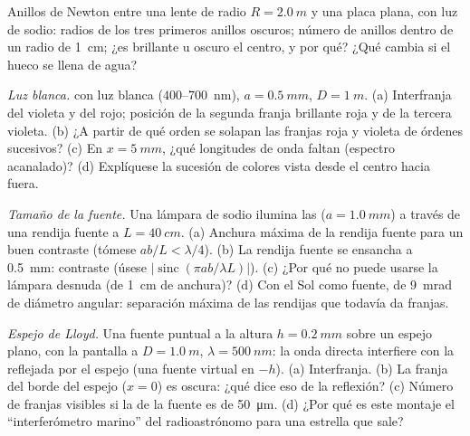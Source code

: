 \begin{exercise}[$\star$]\label{exo:b2:two-wave-interference:4}
Anillos de Newton entre una lente de radio $R = \qty{2.0}{m}$ y una placa plana, con
luz de sodio: radios de los tres primeros anillos oscuros; número de anillos
dentro de un radio de \qty{1}{cm}; ¿es brillante u oscuro el centro, y por qué?
¿Qué cambia si el hueco se llena de agua?
\end{exercise}

\begin{exercise}[$\star\star$]\label{exo:b2:two-wave-interference:5}
\emph{Luz blanca.}  con luz blanca ($400$--\qty{700}{nm}),
$a = \qty{0.5}{mm}$, $D = \qty{1}{m}$. (a) Interfranja del violeta y del rojo;
posición de la segunda franja brillante roja y de la tercera violeta. (b)
¿A partir de qué orden se solapan las franjas roja y violeta de órdenes
sucesivos? (c) En $x = \qty{5}{mm}$, ¿qué longitudes de onda faltan
(espectro acanalado)? (d) Explíquese la sucesión de colores vista desde
el centro hacia fuera.
\end{exercise}

\begin{exercise}[$\star\star$]\label{exo:b2:two-wave-interference:6}
\emph{Tamaño de la fuente.} Una lámpara de sodio ilumina las  ($a = \qty{1.0}{mm}$)
a través de una rendija fuente a $L = \qty{40}{cm}$. (a) Anchura máxima de la
rendija fuente para un buen contraste (tómese $ab/L < \lambda/4$). (b) La rendija fuente
se ensancha a \qty{0.5}{mm}: contraste (úsese $|\operatorname{sinc}(\pi ab/\lambda L)|$).
(c) ¿Por qué no puede usarse la lámpara desnuda (de \qty{1}{cm} de anchura)? (d) Con
el Sol como fuente, de \qty{9}{mrad} de diámetro angular: separación máxima de las rendijas que
todavía da franjas.
\end{exercise}

\begin{exercise}[$\star\star$]\label{exo:b2:two-wave-interference:7}
\emph{Espejo de Lloyd.} Una fuente puntual a la altura $h = \qty{0.2}{mm}$ sobre un
espejo plano, con la pantalla a $D = \qty{1.0}{m}$, $\lambda = \qty{500}{nm}$: la onda directa
interfiere con la reflejada por el espejo (una fuente virtual en
$-h$). (a) Interfranja. (b) La franja del borde del espejo ($x = 0$) es
oscura: ¿qué dice eso de la reflexión? (c) Número de franjas
visibles si la  de la fuente es de \qty{50}{\micro m}. (d) ¿Por qué es
este montaje el ``interferómetro marino'' del radioastrónomo para una
estrella que sale?
\end{exercise}

